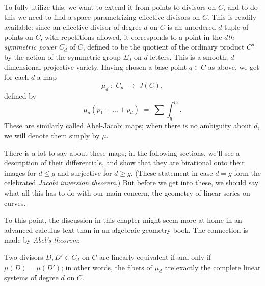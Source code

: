 To fully utilize this, we want to extend it from points  to divisors on $C$, and to do this we need to find a space parametrizing effective divisors on $C$. This is readily available: since an effective divisor of degree $d$ on $C$ is an unordered $d$-tuple of points on $C$, with repetitions allowed, it corresponds to a point in the \emph{$d$th symmetric power} $C_d$ of $C$, defined to be the quotient of the ordinary product $C^d$ by the action of the symmetric group $\Sigma_d$ on $d$ letters. This is a smooth, $d$-dimensional projective variety. Having chosen a base point $q \in C$ as above, we get for each $d$ a map
$$
\mu_d \; : \; C_d \; \to \; J(C),
$$
defined by
$$
\mu_d(p_1 + \dots + p_d) \; = \; \sum \int_q^{p_i}.
$$
These are similarly called  Abel-Jacobi maps; when there is no ambiguity about $d$, we will denote them simply by $\mu$.

There is a lot to say about these maps; in the following sections, we'll see a description of their differentials, and show that they are birational onto their images for $d \leq g$ and surjective for $d \geq g$. (These statement in case $d=g$ form the celebrated \emph{Jacobi inversion theorem}.) But before we get into these, we should say what all this has to do with our main concern, the geometry of linear series on curves.

To this point, the discussion in this chapter might seem more at home in an advanced calculus text than in an algebraic geometry book. The connection is made by \emph{Abel's theorem}:

\begin{theorem}
Two divisors $D, D' \in C_d$ on $C$ are linearly equivalent if and only if $\mu(D) = \mu(D')$; in other words, the fibers of $\mu_d$ are exactly the complete linear systems of degree $d$ on $C$.
\end{theorem}

